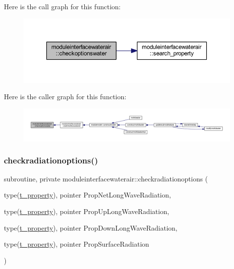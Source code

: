 Here is the call graph for this function\+:\nopagebreak
\begin{figure}[H]
\begin{center}
\leavevmode
\includegraphics[width=350pt]{namespacemoduleinterfacewaterair_a6ca031d04555d7ec7193b26144ed978f_cgraph}
\end{center}
\end{figure}
Here is the caller graph for this function\+:\nopagebreak
\begin{figure}[H]
\begin{center}
\leavevmode
\includegraphics[width=350pt]{namespacemoduleinterfacewaterair_a6ca031d04555d7ec7193b26144ed978f_icgraph}
\end{center}
\end{figure}
\mbox{\label{namespacemoduleinterfacewaterair_a285710ae41f9eb54923e88dfcaf64681}} 
\subsubsection{\texorpdfstring{checkradiationoptions()}{checkradiationoptions()}}
{\footnotesize\ttfamily subroutine, private moduleinterfacewaterair\+::checkradiationoptions (\begin{DoxyParamCaption}\item[{type(\mbox{\hyperlink{structmoduleinterfacewaterair_1_1t__property}{t\+\_\+property}}), pointer}]{Prop\+Net\+Long\+Wave\+Radiation,  }\item[{type(\mbox{\hyperlink{structmoduleinterfacewaterair_1_1t__property}{t\+\_\+property}}), pointer}]{Prop\+Up\+Long\+Wave\+Radiation,  }\item[{type(\mbox{\hyperlink{structmoduleinterfacewaterair_1_1t__property}{t\+\_\+property}}), pointer}]{Prop\+Down\+Long\+Wave\+Radiation,  }\item[{type(\mbox{\hyperlink{structmoduleinterfacewaterair_1_1t__property}{t\+\_\+property}}), pointer}]{Prop\+Surface\+Radiation }\end{DoxyParamCaption})\hspace{0.3cm}{\ttfamily [private]}}

